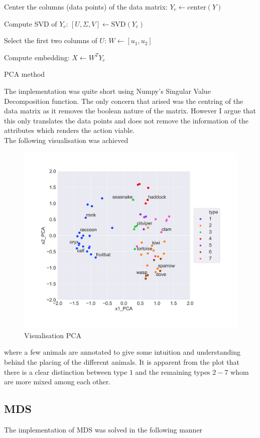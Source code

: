 \begin{algorithm}[H]
\SetAlgoLined
{}
 Center the columns (data points) of the data matrix: $Y_c \gets \text{center}(Y)$

 Compute SVD of $Y_c$: $[U,\Sigma, V] \gets \text{SVD}(Y_c)$

 Select the first two columns of $U$: $W \gets [u_1, u_2]$

Compute embedding: $X \gets W^T Y_c$
 \caption{PCA method}
\end{algorithm}


The implementation was quite short using Numpy's Singular Value Decomposition function. The only concern that arised was the centring of the data matrix as it removes the boolean nature of the matrix. However I argue that this only translates the data points and does not remove the information of the attributes which renders the action viable.
\\

The following visualisation was achieved

\begin{figure}[H]
  \centering
  \includegraphics[width = 0.8\linewidth]{../Visualization_PCA.png}
  \caption{Visualisation PCA}
  \label{vis_PCA}
\end{figure}

where a few animals are annotated to give some intuition and understanding behind the placing of the different animals. It is apparent from the plot that there is a clear distinction between type $1$ and the remaining types $2-7$ whom are more mixed among each other.


\subsection*{MDS}
The implementation of MDS was solved in the following manner

